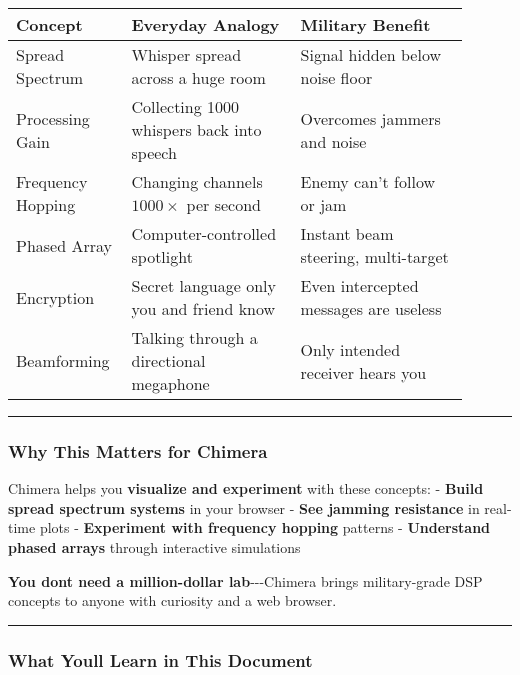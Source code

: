 \begin{center}
\begin{tabular}{@{}p{0.2\linewidth}p{0.35\linewidth}p{0.35\linewidth}@{}}
\toprule
\textbf{Concept} & \textbf{Everyday Analogy} & \textbf{Military Benefit} \\
\midrule
Spread Spectrum & Whisper spread across a huge room & Signal hidden below noise floor \\
Processing Gain & Collecting 1000 whispers back into speech & Overcomes jammers and noise \\
Frequency Hopping & Changing channels $1000\times$ per second & Enemy can't follow or jam \\
Phased Array & Computer-controlled spotlight & Instant beam steering, multi-target \\
Encryption & Secret language only you and friend know & Even intercepted messages are useless \\
Beamforming & Talking through a directional megaphone & Only intended receiver hears you \\
\bottomrule
\end{tabular}
\end{center}

\begin{center}\rule{0.5\linewidth}{0.5pt}\end{center}

\subsubsection{Why This Matters for
Chimera}\label{why-this-matters-for-chimera}

Chimera helps you \textbf{visualize and experiment} with these concepts:
- \textbf{Build spread spectrum systems} in your browser - \textbf{See
jamming resistance} in real-time plots - \textbf{Experiment with
frequency hopping} patterns - \textbf{Understand phased arrays} through
interactive simulations

\textbf{You don\textquotesingle t need a million-dollar
lab}-\/-\/-Chimera brings military-grade DSP concepts to anyone with
curiosity and a web browser.

\begin{center}\rule{0.5\linewidth}{0.5pt}\end{center}

\subsubsection{What You\textquotesingle ll Learn in This
Document}\label{what-youll-learn-in-this-document}

